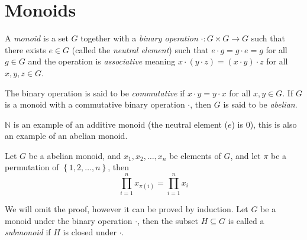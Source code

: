 \section{Monoids}%
\label{sec:monoids}


A \textit{monoid} is a set $G$ together with a \textit{binary operation} $\cdot : G \times G \to G$ such that there exists $e \in G$ (called the \textit{neutral element}) such that $e \cdot g = g \cdot e = g$ for all $g \in G$ and the operation is \textit{associative} meaning $x \cdot (y \cdot z) = (x \cdot y) \cdot z$ for all $x, y, z \in G$.

The binary operation is said to be \textit{commutative} if $x \cdot y = y \cdot x$ for all $x, y \in G$. If $G$ is a monoid with a commutative binary operation $\cdot$, then $G$ is said to be \textit{abelian}.

\begin{example}
  $\mathbb{N}$ is an example of an additive monoid (the neutral element ($e$) is $0$), this is also an example of an abelian monoid.
\end{example}

\begin{proposition}\label{prop:commutative_product}
  Let $G$ be a abelian monoid, and $x_1, x_2, \ldots, x_{n}$ be elements of $G$, and let $\pi$ be a permutation of $\left\{1, 2, \ldots, n\right\}$, then
  \begin{equation*}
    \prod^n_{i = 1}x_{\pi(i)} = \prod^n_{i = 1}x_{i}
  \end{equation*}
\end{proposition}
We will omit the proof, however it can be proved by induction.
Let $G$ be a monoid under the binary operation $\cdot$, then the subset $H \subseteq G$ is called a \textit{submonoid} if $H$ is closed under $\cdot$.
